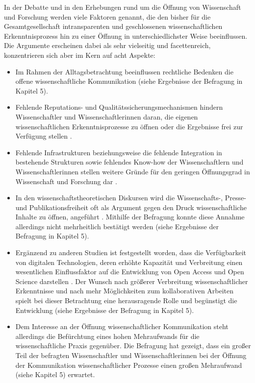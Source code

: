 In der Debatte und in den Erhebungen rund um die Öffnung von Wissenschaft und Forschung werden viele Faktoren genannt, die den bisher für die Gesamtgesellschaft intransparenten und geschlossenen wissenschaftlichen Erkenntnisprozess hin zu einer Öffnung in unterschiedlichster Weise beeinflussen. Die Argumente erscheinen dabei als sehr vielseitig und facettenreich, konzentrieren sich aber im Kern auf acht Aspekte:

\begin{itemize}
\item Im Rahmen der Alltagsbetrachtung beeinflussen rechtliche Bedenken die offene wissenschaftliche Kommunikation (siehe Ergebnisse der Befragung in Kapitel 5).
\item Fehlende Reputations- und Qualitätssicherungsmechanismen hindern Wissenschaftler und Wissenschaftlerinnen daran, die eigenen wissenschaftlichen Erkenntnisprozesse zu öffnen oder die Ergebnisse frei zur Verfügung stellen \cite{herb_2015}.
\item Fehlende Infrastrukturen beziehungsweise die fehlende Integration in bestehende Strukturen sowie fehlendes Know-how der Wissenschaftlern und Wissenschaftlerinnen stellen weitere Gründe für den geringen Öffnungsgrad in Wissenschaft und Forschung dar \cite{European_Commission_2015b}.
\item In den wissenschaftstheoretischen Diskursen wird die Wissenschafts-, Presse- und Publikationsfreiheit oft als Argument gegen den Druck wissenschaftliche Inhalte zu öffnen, angeführt \cite{Fehling_2014}. Mithilfe der Befragung konnte diese Annahme allerdings nicht mehrheitlich bestätigt werden (siehe Ergebnisse der Befragung in Kapitel 5).
\item Ergänzend zu anderen Studien ist festgestellt worden, dass die Verfügbarkeit von digitalen Technologien, deren erhöhte Kapazität und Verbreitung einen wesentlichen Einflussfaktor auf die Entwicklung von Open Access und Open Science darstellen \cite{European_Commission_2015b}. Der Wunsch nach größerer Verbreitung wissenschaftlicher Erkenntnisse und nach mehr Möglichkeiten zum kollaborativen Arbeiten spielt bei dieser Betrachtung eine herausragende Rolle und begünstigt die Entwicklung (siehe Ergebnisse der Befragung in Kapitel 5).
\item Dem Interesse an der Öffnung wissenschaftlicher Kommunikation steht allerdings die Befürchtung eines hohen Mehraufwands für die wissenschaftliche Praxis gegenüber. Die Befragung hat gezeigt, dass ein großer Teil der befragten Wissenschaftler und Wissenschaftlerinnen bei der Öffnung der Kommunikation wissenschaftlicher Prozesse einen großen Mehraufwand (siehe Kapitel 5) erwartet.

\end{itemize}
